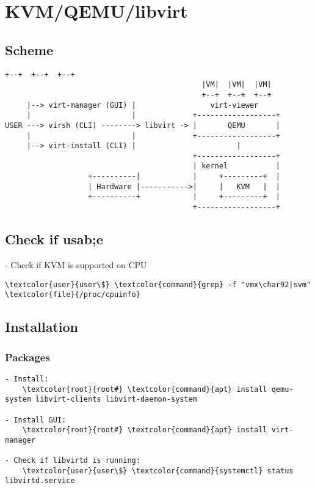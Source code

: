 \documentclass[10pt, a4paper, onecolumn, openany]{book} %
\begin{document}
\chapter{KVM/QEMU/libvirt}
\section{Scheme}
\begin{Verbatim}[commandchars=\\\{\}]
                                             +--+  +--+  +--+
                                             |VM|  |VM|  |VM|
                                             +--+  +--+  +--+
     |--> virt-manager (GUI) |                 virt-viewer
     |                       |             +------------------+
USER ---> virsh (CLI) --------> libvirt -> |       QEMU       |
     |                       |             +------------------+
     |--> virt-install (CLI) |                       |
                                           +------------------+
                                           | kernel           |
                   +----------|            |     +---------+  |
                   | Hardware |----------->|     |   KVM   |  |
                   +----------+            |     +---------+  |
                                           +------------------+
\end{Verbatim}
\section{Check if usab;e}
- Check if KVM is supported on CPU
\begin{Verbatim}[commandchars=\\\{\}]
    \textcolor{user}{user\$} \textcolor{command}{grep} -f "vmx\char92|svm" \textcolor{file}{/proc/cpuinfo}
\end{Verbatim}

\section{Installation}
\subsection{Packages}
\begin{Verbatim}[commandchars=\\\{\}]
- Install:
    \textcolor{root}{root#} \textcolor{command}{apt} install qemu-system libvirt-clients libvirt-daemon-system

- Install GUI:
    \textcolor{root}{root#} \textcolor{command}{apt} install virt-manager

- Check if libvirtd is running:
    \textcolor{user}{user\$} \textcolor{command}{systemctl} status libvirtd.service
\end{Verbatim}
\end{document}
